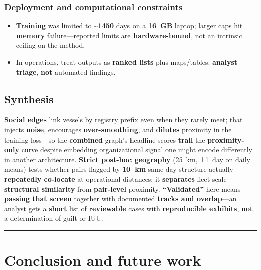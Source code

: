 \documentclass[
]{article}
\providecommand{\tightlist}{%
  \setlength{\itemsep}{0pt}\setlength{\parskip}{0pt}}
\begin{document}
\subsubsection{Deployment and computational
constraints}\label{deployment-and-computational-constraints}

\begin{itemize}
\tightlist
\item
  \textbf{Training} was limited to \textbf{\textasciitilde1450} days on
  a \textbf{16~GB} laptop; larger caps hit \textbf{memory}
  failure---reported limits are \textbf{hardware-bound}, not an
  intrinsic ceiling on the method.\\
\item
  In operations, treat outputs as \textbf{ranked lists} plus
  maps/tables: \textbf{analyst triage}, \textbf{not} automated findings.
\end{itemize}

\subsection{Synthesis}\label{synthesis}

\textbf{Social edges} link vessels by registry prefix even when they
rarely meet; that injects \textbf{noise}, encourages
\textbf{over-smoothing}, and \textbf{dilutes} proximity in the training
loss---so the \textbf{combined} graph's headline scores \textbf{trail}
the \textbf{proximity-only} curve despite embedding organizational
signal one might encode differently in another architecture.
\textbf{Strict post-hoc geography} (25~km, ±1~day on daily means) tests
whether pairs flagged by \textbf{10~km} same-day structure actually
\textbf{repeatedly co-locate} at operational distances; it
\textbf{separates} fleet-scale \textbf{structural similarity} from
\textbf{pair-level} proximity. \textbf{``Validated''} here means
\textbf{passing that screen} together with documented \textbf{tracks and
overlap}---an analyst gets a \textbf{short} list of \textbf{reviewable}
cases with \textbf{reproducible exhibits}, \textbf{not} a determination
of guilt or IUU.

\begin{center}\rule{0.5\linewidth}{0.5pt}\end{center}

\section{Conclusion and future work}\label{conclusion-and-future-work}
\end{document}

